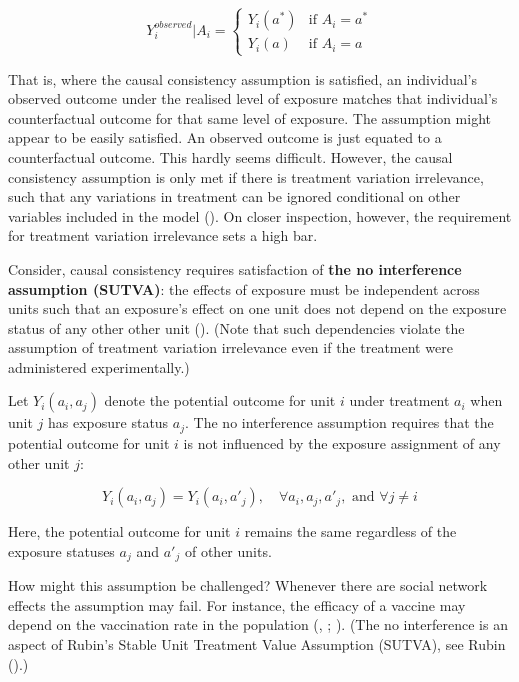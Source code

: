 \documentclass[
  singlecolumn]{article}
\begin{document}
\[
Y_i^{observed}|A_i = 
\begin{cases} 
Y_i(a^*) & \text{if } A_i = a^* \\
Y_i(a) & \text{if } A_i = a
\end{cases}
\]

That is, where the causal consistency assumption is satisfied, an
individual's observed outcome under the realised level of exposure
matches that individual's counterfactual outcome for that same level of
exposure. The assumption might appear to be easily satisfied. An
observed outcome is just equated to a counterfactual outcome. This
hardly seems difficult. However, the causal consistency assumption is
only met if there is treatment variation irrelevance, such that any
variations in treatment can be ignored conditional on other variables
included in the model (). On closer inspection, however, the requirement for treatment
variation irrelevance sets a high bar.

Consider, causal consistency requires satisfaction of \textbf{the no
interference assumption (SUTVA)}: the effects of exposure must be
independent across units such that an exposure's effect on one unit does
not depend on the exposure status of any other other unit
(). (Note that such dependencies
violate the assumption of treatment variation irrelevance even if the
treatment were administered experimentally.)

Let \(Y_i(a_i, a_j)\) denote the potential outcome for unit \(i\) under
treatment \(a_i\) when unit \(j\) has exposure status \(a_j\). The no
interference assumption requires that the potential outcome for unit
\(i\) is not influenced by the exposure assignment of any other unit
\(j\):

\[
Y_i(a_i, a_j) = Y_i(a_i, a'_j), \quad \forall a_i, a_j, a'_j, \text{ and } \forall j \neq i
\]

Here, the potential outcome for unit \(i\) remains the same regardless
of the exposure statuses \(a_j\) and \(a'_j\) of other units.

How might this assumption be challenged? Whenever there are social
network effects the assumption may fail. For instance, the efficacy of a
vaccine may depend on the vaccination rate in the population
(,
; ). (The no interference is an aspect of Rubin's
Stable Unit Treatment Value Assumption (SUTVA), see Rubin
().)
\end{document}
